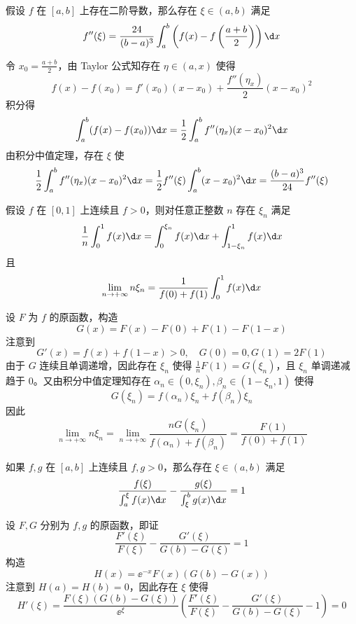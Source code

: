 \begin{problem}[000049]
假设 $f$ 在 $[a, b]$ 上存在二阶导数，那么存在 $\xi \in (a, b)$ 满足
\[ f''(\xi) = \frac{24}{(b-a)^3} \int_{a}^{b} \left(f(x) - f\left(\frac{a+b}{2}\right)\right) \d x \]
\end{problem}

\begin{solution}
	令 $x_0 = \frac{a+b}{2}$，由 Taylor 公式知存在 $\eta \in (a, x)$ 使得
	\[ f(x) - f(x_0) = f'(x_0)(x - x_0) + \frac{f''(\eta_x)}{2} (x - x_0)^2 \]
	积分得
	\[ \int_{a}^{b} (f(x) - f(x_0)) \d x = \frac{1}{2} \int_{a}^{b} f''(\eta_x) (x - x_0)^2 \d x  \]
	由积分中值定理，存在 $\xi$ 使
	\[ \frac{1}{2} \int_{a}^{b} f''(\eta_x) (x - x_0)^2 \d x = \frac{1}{2} f''(\xi) \int_{a}^{b} (x - x_0)^2 \d x = \frac{(b-a)^3}{24} f''(\xi)   \]
\end{solution}

\begin{problem}[000050]
假设 $f$ 在 $[0, 1]$ 上连续且 $f > 0$，则对任意正整数 $n$ 存在 $\xi_n$ 满足
\[ \frac{1}{n} \int_{0}^{1} f(x) \d x = \int_{0}^{\xi_n} f(x) \d x + \int_{1 - \xi_n}^{1} f(x) \d x \]
且
\[ \lim_{n \to +\infty} n \xi_n = \frac{1}{f(0) + f(1)} \int_{0}^{1} f(x) \d x \]
\end{problem}

\begin{solution}
	设 $F$ 为 $f$ 的原函数，构造
	\[ G(x) = F(x) - F(0) + F(1) - F(1 - x) \]
	注意到
	\[ G'(x) = f(x) + f(1 - x) > 0, \quad G(0) = 0, G(1) = 2F(1) \]
	由于 $G$ 连续且单调递增，因此存在 $\xi_n$ 使得 $\frac{1}{n}F(1) = G(\xi_n)$，且 $\xi_n$ 单调递减趋于 $0$。又由积分中值定理知存在 $\alpha_n \in (0, \xi_n), \beta_n \in (1-\xi_n, 1)$ 使得
	\[ G(\xi_n) = f(\alpha_n) \xi_n + f(\beta_n) \xi_n \]
	因此
	\[ \lim_{n \to +\infty} n \xi_n = \lim_{n \to +\infty} \frac{n G(\xi_n)}{f(\alpha_n) + f(\beta_n)} = \frac{F(1)}{f(0) + f(1)} \]
\end{solution}

\begin{problem}[000051]
如果 $f,g$ 在 $[a,b]$ 上连续且 $f, g > 0$，那么存在 $\xi \in (a,b)$ 满足
\[ \frac{f(\xi)}{\int_{a}^{\xi} f(x) \d x} - \frac{g(\xi)}{\int_{\xi}^{b} g(x) \d x} = 1 \]
\end{problem}

\begin{solution}
	设 $F, G$ 分别为 $f, g$ 的原函数，即证
	\[ \frac{F'(\xi)}{F(\xi)} - \frac{G'(\xi)}{G(b) - G(\xi)} = 1 \]
	构造
	\[ H(x) = \ee^{-x} F(x) (G(b) - G(x)) \]
	注意到 $H(a) = H(b) = 0$，因此存在 $\xi$ 使得
	\[ H'(\xi) = \frac{F(\xi) (G(b) - G(\xi))}{\ee^{\xi}} \left(\frac{F'(\xi)}{F(\xi)} - \frac{G'(\xi)}{G(b) - G(\xi)} - 1\right) = 0 \]
\end{solution}

